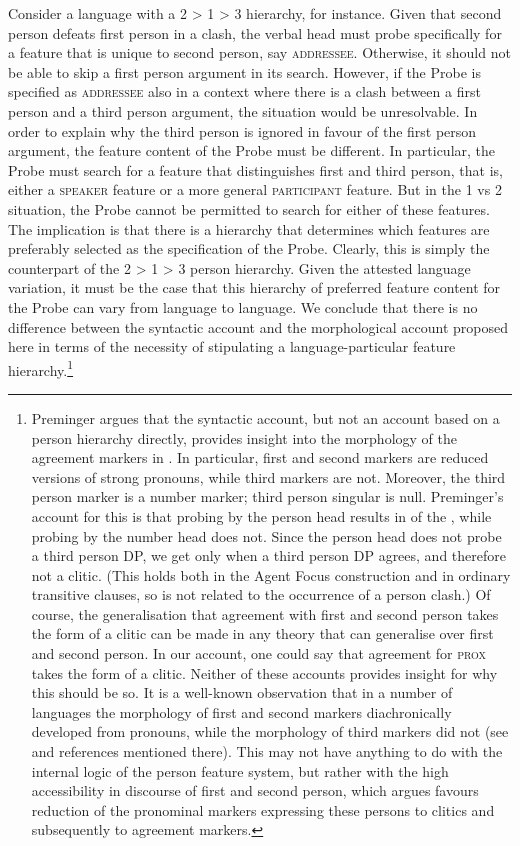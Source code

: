 \documentclass[output=paper]{langsci/langscibook}
\begin{document}
  Consider a language with a 2 > 1 > 3 hierarchy, for instance. Given that second person defeats first person in a clash, the verbal head must probe specifically for a feature that is unique to second person, say \textsc{addressee}. Otherwise, it should not be able to skip a first person argument in its search. However, if the Probe is specified as \textsc{addressee} also in a context where there is a clash between a first person and a third person argument, the situation would be unresolvable. In order to explain why the third person is ignored in favour of the first person argument, the feature content of the Probe must be different. In particular, the Probe must search for a feature that distinguishes first and third person, that is, either a \textsc{speaker} feature or a more general \textsc{participant} feature. But in the 1 vs 2 situation, the Probe cannot be permitted to search for either of these features. The implication is that there is a hierarchy that determines which features are preferably selected as the specification of the Probe. Clearly, this is simply the counterpart of the 2 > 1 > 3 person hierarchy. Given the attested language variation, it must be the case that this hierarchy of preferred feature content for the Probe can vary from language to language. We conclude that there is no difference between the syntactic account and the morphological account proposed here in terms of the necessity of stipulating a language-particular feature hierarchy.\footnote{Preminger argues that the syntactic account, but not an account based on a person hierarchy directly, provides insight into the morphology of the agreement markers in . In particular, first and second  markers are reduced versions of strong pronouns, while third  markers are not. Moreover, the third person marker is a number marker; third person singular is null. Preminger’s account for this is that probing by the person head results in  of the , while probing by the number head does not. Since the person head does not probe a third person DP, we get only  when a third person DP agrees, and therefore not a clitic. (This holds both in the Agent Focus construction and in ordinary transitive clauses, so is not related to the occurrence of a person clash.) Of course, the generalisation that agreement with first and second person takes the form of a clitic can be made in any theory that can generalise over first and second person. In our account, one could say that agreement for \textsc{prox} takes the form of a clitic. Neither of these accounts provides insight for why this should be so. It is a well-known observation that in a number of languages the morphology of first and second  markers diachronically developed from pronouns, while the morphology of third  markers did not (see \citealt{Fuß2005} and references mentioned there). This may not have anything to do with the internal logic of the person feature system, but rather with the high accessibility in discourse of first and second person, which \citet{Ariel2000} argues favours reduction of the pronominal markers expressing these persons to clitics and subsequently to agreement markers.}
\end{document}
